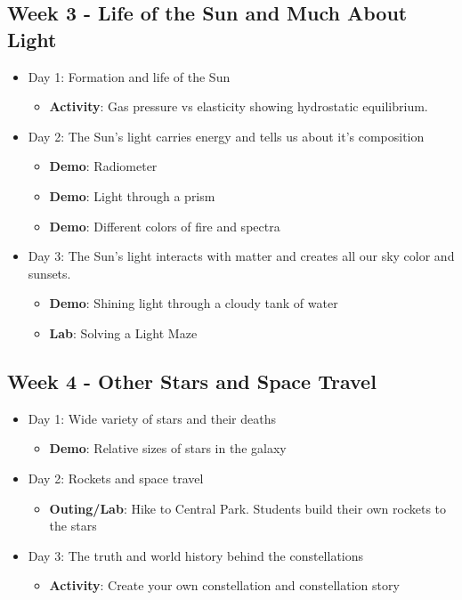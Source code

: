 \subsection*{Week 3 - Life of the Sun and Much About Light}
\begin{itemize}
\item Day 1: Formation and life of the Sun
	\begin{itemize}
	\item \textbf{Activity}: Gas pressure vs elasticity showing hydrostatic equilibrium.
	\end{itemize}
\item Day 2: The Sun's light carries energy and tells us about it's composition
	\begin{itemize}
	\item \textbf{Demo}: Radiometer
	\item \textbf{Demo}: Light through a prism
	\item \textbf{Demo}: Different colors of fire and spectra
	\end{itemize}
\item Day 3: The Sun's light interacts with matter and creates all our sky color and sunsets.
	\begin{itemize}
	\item \textbf{Demo}: Shining light through a cloudy tank of water
	\item \textbf{Lab}: Solving a Light Maze
	\end{itemize}
\end{itemize}

\subsection*{Week 4 - Other Stars and Space Travel}
\begin{itemize}
\item Day 1: Wide variety of stars and their deaths
	\begin{itemize}
	\item \textbf{Demo}: Relative sizes of stars in the galaxy
	\end{itemize}
\item Day 2: Rockets and space travel
	\begin{itemize}
	\item \textbf{Outing/Lab}: Hike to Central Park.  Students build their own rockets to the stars
	\end{itemize}
\item Day 3: The truth and world history behind the constellations
	\begin{itemize}
	\item \textbf{Activity}: Create your own constellation and constellation story
	\end{itemize}
\end{itemize}

